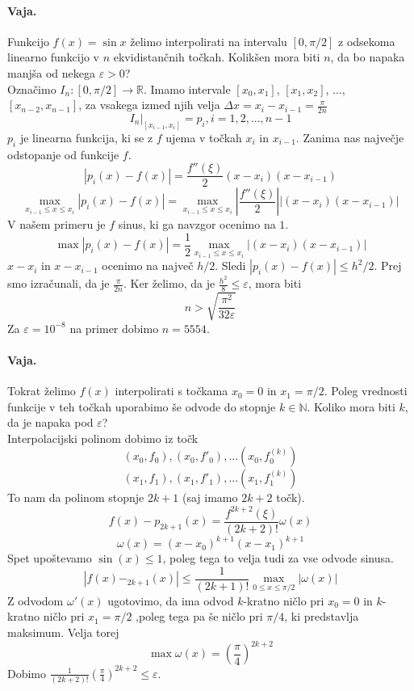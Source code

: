 \documentclass[a4paper]{article}
\newcommand{\R}{\mathbb{R}}
\newcommand{\N}{\mathbb{N}}
\newcommand{\fn}[3]{{#1}\colon {#2} \rightarrow {#3}}
\begin{document}
\paragraph{Vaja.} Funkcijo $f(x) = \sin x$ želimo interpolirati na intervalu $[0, \pi/2]$ z odsekoma linearno funkcijo v $n$ ekvidistančnih točkah. Kolikšen mora biti $n$, da bo napaka manjša od nekega $\varepsilon > 0$? \\[3mm]
Označimo $\fn{I_n}{[0, \pi/2]}{\R}$. Imamo intervale $[x_0, x_1]$, $[x_{1}, x_2]$, ..., $[x_{n-2}, x_{n-1}]$, za vsakega izmed njih velja $\displaystyle{\Delta x = x_{i} - x_{i-1} = \frac{\pi}{2n}}$
$$I_n\Big|_{[x_{i-1}, x_{i}]} = p_i, i=1, 2, ..., n-1$$
$p_i$ je linearna funkcija, ki se z $f$ ujema v točkah $x_i$ in $x_{i-1}$. Zanima nas največje odstopanje od funkcije $f$.
$$|p_i(x) - f(x)| = \frac{f''(\xi)}{2}(x-x_i)(x-x_{i-1})$$
$$\max_{x_{i-1} \leq x \leq x_{i}} |p_i(x) - f(x)| = \max_{x_{i-1} \leq x \leq x_{i}} \left|\frac{f''(\xi)}{2}\right||(x-x_i)(x-x_{i-1})|$$
V našem primeru je $f$ sinus, ki ga navzgor ocenimo na $1$.
$$\max |p_i(x) - f(x)| = \frac{1}{2}\max_{x_{i-1} \leq x \leq x_{i}} |(x-x_i)(x-x_{i-1})|$$
$x-x_i$ in $x-x_{i-1}$ ocenimo na največ $h/2$. Sledi $|p_i(x) - f(x)| \leq h^2/2$.
Prej smo izračunali, da je $\displaystyle{\frac{\pi}{2n}}$. Ker želimo, da je $\displaystyle{\frac{h^2}{8}\leq\varepsilon}$, mora biti
$$n > \sqrt{\frac{\pi^2}{32\varepsilon}}$$
Za $\varepsilon = 10^{-8}$ na primer dobimo $n=5554$.
\paragraph{Vaja.} Tokrat želimo $f(x)$ interpolirati s točkama $x_0 = 0$ in $x_1 = \pi/2$. Poleg vrednosti funkcije v teh točkah uporabimo še odvode do stopnje $k\in\N$. Koliko mora biti $k$, da je napaka pod $\varepsilon$? \\[3mm]
Interpolacijski polinom dobimo iz točk
$$(x_0, f_0), (x_0, f'_0), ... (x_0, f_0^{(k)})$$
$$(x_1, f_1), (x_1, f'_1), ... (x_1, f_1^{(k)})$$
To nam da polinom stopnje $2k+1$ (saj imamo $2k+2$ točk).
$$f(x) - p_{2k+1}(x) = \frac{f^{2k+2}(\xi)}{(2k+2)!}\omega(x)$$
$$\omega(x) = (x-x_0)^{k+1}(x-x_1)^{k+1}$$
Spet upoštevamo $\sin(x) \leq 1$, poleg tega to velja tudi za vse odvode sinusa.
$$|f(x) - _{2k+1}(x)| \leq \frac{1}{(2k+1)!}\max_{0 \leq x \leq \pi/2}|\omega(x)|$$
Z odvodom $\omega'(x)$ ugotovimo, da ima odvod $k$-kratno ničlo pri $x_0 = 0$ in $k$-kratno ničlo pri $x_1 = \pi/2$ ,poleg tega pa še ničlo pri $\pi/4$, ki predstavlja maksimum.
Velja torej $$\max \omega(x) = \left(\frac{\pi}{4}\right)^{2k+2}$$
Dobimo $\frac{1}{(2k+2)!} \left(\frac{\pi}{4}\right)^{2k+2} \leq \varepsilon$.
\end{document}
